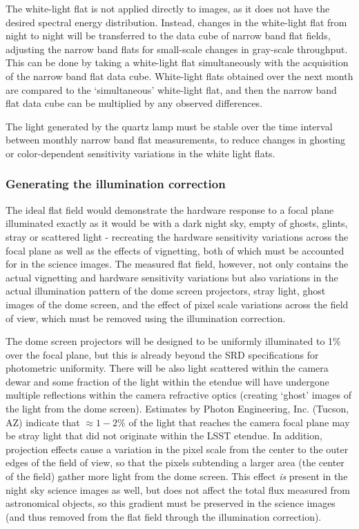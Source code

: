 \documentclass[12pt,preprint]{aastex}
\begin{document}
The white-light flat is not applied directly to images, as it
does not have the desired spectral energy distribution. Instead,
changes in the white-light flat from night to night will be
transferred to the data cube of narrow band flat fields, adjusting the
narrow band flats for small-scale changes in gray-scale
throughput. This can be done by taking a white-light flat
simultaneously with the acquisition of the narrow band flat data
cube. White-light flats obtained over the next month are compared to
the `simultaneous' white-light flat, and then the narrow band flat
data cube can be multiplied by any observed differences.

The light generated by the quartz lamp must be stable over the time
interval between monthly narrow band flat measurements, to reduce
changes in ghosting or color-dependent sensitivity variations in the
white light flats.

\subsubsection{Generating the illumination correction}
\label{sec:ic}

The ideal flat field would demonstrate the hardware response to a
focal plane illuminated exactly as it would be with a dark night sky,
empty of ghosts, glints, stray or scattered light - recreating the
hardware sensitivity variations across the focal plane as well as the
effects of vignetting, both of which must be accounted for in the
science images. The measured flat field, however, not only contains
the actual vignetting and hardware sensitivity variations but also
variations in the actual illumination pattern of the dome screen
projectors, stray light, ghost images of the dome screen, and the
effect of pixel scale variations across the field of view, which must
be removed using the illumination correction. 

The dome screen projectors will be designed to be uniformly
illuminated to 1\% over the focal plane, but this is already beyond
the SRD specifications for photometric uniformity.  There will be also
light scattered within the camera dewar and some fraction of the light
within the etendue will have undergone multiple reflections within the
camera refractive optics (creating `ghost' images of the light from
the dome screen). Estimates by Photon Engineering, Inc. (Tucson, AZ)
indicate that $\approx1-2\%$ of the light that reaches the camera
focal plane may be stray light that did not originate within the LSST
etendue. In addition, projection effects cause a variation in the
pixel scale from the center to the outer edges of the field of view,
so that the pixels subtending a larger area (the center of the field)
gather more light from the dome screen. This effect {\it is} present
in the night sky science images as well, but does not affect the total
flux measured from astronomical objects, so this gradient must be
preserved in the science images (and thus removed from the flat field
through the illumination correction). 
\end{document}
